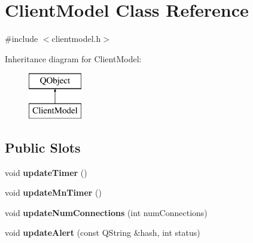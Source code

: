 \hypertarget{class_client_model}{}\section{Client\+Model Class Reference}
\label{class_client_model}


{\ttfamily \#include $<$clientmodel.\+h$>$}

Inheritance diagram for Client\+Model\+:\begin{figure}[H]
\begin{center}
\leavevmode
\includegraphics[height=2.000000cm]{class_client_model}
\end{center}
\end{figure}
\subsection*{Public Slots}
\begin{DoxyCompactItemize}
\item 
\mbox{\label{class_client_model_a82d434ebd032c00736e043ce2d36ac5e}} 
void {\bfseries update\+Timer} ()
\item 
\mbox{\label{class_client_model_a2c343f22834086eb6e6172dbcaf6426c}} 
void {\bfseries update\+Mn\+Timer} ()
\item 
\mbox{\label{class_client_model_a75f5a1a83e65aeb8fa01140584904967}} 
void {\bfseries update\+Num\+Connections} (int num\+Connections)
\item 
\mbox{\label{class_client_model_a16758b18ded91ceba202d6023cad4b51}} 
void {\bfseries update\+Alert} (const Q\+String \&hash, int status)
\end{DoxyCompactItemize}
